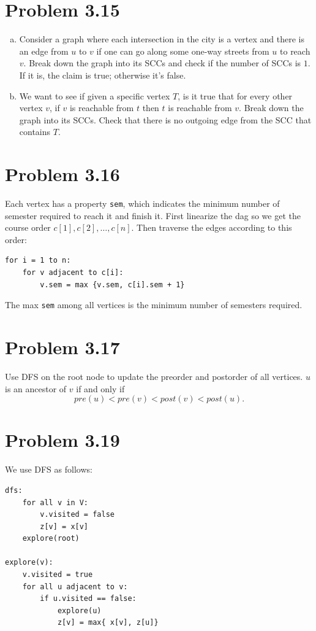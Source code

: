 \documentclass[12pt]{report}
\newcommand{\co}{\texttt}
\begin{document}
\section{Problem 3.15}
\begin{enumerate}[(a)]
	\item Consider a graph where each intersection in the city is a vertex and there is an edge from $u$ to $v$ if one can go along some one-way streets from $u$ to reach $v$. Break down the graph into its SCCs and check if the number of SCCs is $1$. If it is, the claim is true; otherwise it's false.
	\item We want to see if given a specific vertex $T$, is it true that for every other vertex $v$, if $v$ is reachable from $t$ then $t$ is reachable from $v$. Break down the graph into its SCCs. Check that there is no outgoing edge from the SCC that contains $T$.
\end{enumerate}

\section{Problem 3.16}
Each vertex has a property \co{sem}, which indicates the minimum number of semester required to reach it and finish it. First linearize the dag so we get the course order $c[1], c[2], \ldots, c[n]$. Then traverse the edges according to this order:
\begin{lstlisting}
for i = 1 to n:
	for v adjacent to c[i]:
		v.sem = max {v.sem, c[i].sem + 1}
\end{lstlisting}
The max \co{sem} among all vertices is the minimum number of semesters required.

\section{Problem 3.17}
Use DFS on the root node to update the preorder and postorder of all vertices. $u$ is an ancestor of $v$ if and only if $$pre(u) < pre(v) < post(v) < post(u).$$

\section{Problem 3.19}
We use DFS as follows:
\begin{lstlisting}
dfs:
	for all v in V:
		v.visited = false
		z[v] = x[v]
	explore(root)

explore(v):
	v.visited = true
	for all u adjacent to v:
		if u.visited == false:
			explore(u)
			z[v] = max{ x[v], z[u]}
\end{lstlisting}
\end{document}
